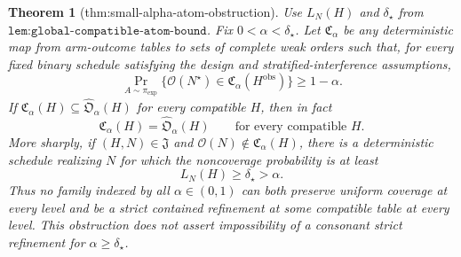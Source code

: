 \documentclass{article}
\newtheorem{theorem}{Theorem}
\begin{document}
\begin{theorem}[thm:small-alpha-atom-obstruction]\label{thm:small-alpha-atom-obstruction}
Use \(L_N(H)\) and \(\delta_\star\) from \(\texttt{lem:global-compatible-atom-bound}\).  Fix \(0<\alpha<\delta_\star\).  Let \(\mathfrak C_\alpha\) be any deterministic map from arm-outcome tables to sets of complete weak orders such that, for every fixed binary schedule satisfying the design and stratified-interference assumptions,
\[
 \Pr_{A\sim\pi_{\exp}}\{\mathcal O(N^\star)\in
       \mathfrak C_\alpha(H^{\mathrm{obs}})\}\ge1-\alpha.
\]
If \(\mathfrak C_\alpha(H)\subseteq\widehat{\mathfrak O}_\alpha(H)\) for every compatible \(H\), then in fact
\[
 \mathfrak C_\alpha(H)=\widehat{\mathfrak O}_\alpha(H)
 \qquad\text{for every compatible }H.
\]
More sharply, if \((H,N)\in\mathfrak J\) and \(\mathcal O(N)\notin\mathfrak C_\alpha(H)\), there is a deterministic schedule realizing \(N\) for which the noncoverage probability is at least
\[
 L_N(H)\ge\delta_\star>\alpha.
\]
Thus no family indexed by all \(\alpha\in(0,1)\) can both preserve uniform coverage at every level and be a strict contained refinement at some compatible table at every level.  This obstruction does not assert impossibility of a consonant strict refinement for \(\alpha\ge\delta_\star\).
\end{theorem}
\end{document}
